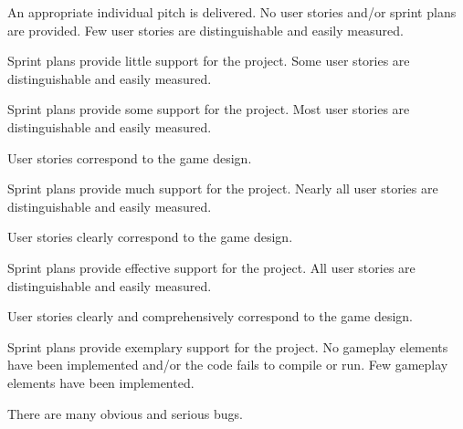 \documentclass{../fal_assignment}
\begin{document}
\begin{markingrubric}
        \grade An appropriate individual pitch is delivered.
%
%
        \grade\fail No user stories and/or sprint plans are provided.
        \grade Few user stories are distinguishable and easily measured.
            \par Sprint plans provide little support for the project.
        \grade Some user stories are distinguishable and easily measured.
            \par Sprint plans provide some support for the project.
        \grade Most user stories are distinguishable and easily measured.
            \par User stories correspond to the game design.
            \par Sprint plans provide much support for the project.
        \grade Nearly all user stories are distinguishable and easily measured.
            \par User stories clearly correspond to the game design.
            \par Sprint plans provide effective support for the project.
        \grade All user stories are distinguishable and easily measured.
            \par User stories clearly and comprehensively correspond to the game design.
            \par Sprint plans provide exemplary support for the project.
%
        \grade\fail No gameplay elements have been implemented and/or the code fails to compile or run.
        \grade Few gameplay elements have been implemented.
            \par There are many obvious and serious bugs.

\end{markingrubric}
\end{document}
